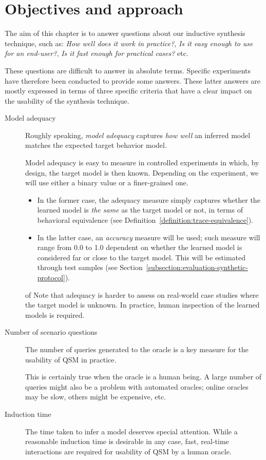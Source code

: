 \section{Objectives and approach\label{section:evaluation-objectives-and-approach}}

The aim of this chapter is to answer questions about our inductive synthesis technique, such as: \emph{How well does it work in practice?}, \emph{Is it easy enough to use for an end-user?}, \emph{Is it fast enough for practical cases?} etc. 

These questions are difficult to answer in absolute terms. Specific experiments have therefore been conducted to provide some answers. These latter answers are mostly expressed in terms of three specific criteria that have a clear impact on the usability of the synthesis technique.
\begin{description}
\item[Model adequacy] Roughly speaking, \emph{model adequacy} captures \emph{how well} an inferred model matches the expected target behavior model. 

Model adequacy is easy to measure in controlled experiments in which, by design, the target model is then known. Depending on the experiment, we will use either a binary value or a finer-grained one.
\begin{itemize}
\item In the former case, the adequacy measure simply captures whether the learned model is \emph{the same} as the target model or not, in terms of behavioral equivalence (see Definition~\ref{definition:trace-equivalence}).
\item In the latter case, an \emph{accuracy} measure will be used; such measure will range from 0.0 to 1.0 dependent on whether the learned model is considered far or close to the target model. This will be estimated through test samples (see Section~\ref{subsection:evaluation-synthetic-protocol}).
\end{itemize}
of 
Note that adequacy is harder to assess on real-world case studies where the target model is unknown. In practice, human inspection of the learned models is required.

\item[Number of scenario questions] The number of queries generated to the oracle is a key measure for the usability of QSM in practice. 

This is certainly true when the oracle is a human being. A large number of queries might also be a problem with automated oracles; online oracles may be slow, others might be expensive, etc.

\item[Induction time] The time taken to infer a model deserves special attention. While a reasonable induction time is desirable in any case, fast, real-time interactions are required for usability of QSM by a human oracle.
\end{description}

